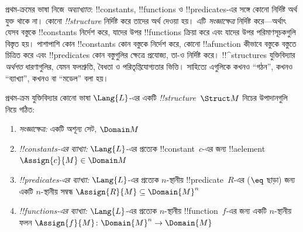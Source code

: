 \documentclass[../../../include/open-logic-section]{subfiles}
\begin{document}


\begin{explain}
প্রথম-ক্রমের ভাষা নিজে \emph{অব্যাখ্যাত}: !!{constant}s,
!!{function}s ও !!{predicate}s-এর সঙ্গে কোনো নির্দিষ্ট অর্থ যুক্ত থাকে
না। কোনো  \emph{!!{structure}} নির্দিষ্ট করে তাদের
অর্থ দেওয়া হয়। এটি \emph{সংজ্ঞাক্ষেত্র} নির্দিষ্ট করে—অর্থাৎ যেসব
বস্তুকে !!{constant}s নির্দেশ করে, যাদের উপর !!{function}s ক্রিয়া করে
এবং যাদের উপর পরিমাণসূচকগুলি বিস্তৃত হয়। পাশাপাশি কোন !!{constant}s
কোন বস্তুকে নির্দেশ করে, কোনো !!a{function} কীভাবে বস্তুকে বস্তুতে
চিত্রিত করে এবং !!{predicate}s কোন বস্তুগুলির ক্ষেত্রে প্রযোজ্য, তা-ও
নির্দিষ্ট করে। !!^{structure}s যুক্তিবিদ্যার \emph{অর্থগত} ধারণাগুলির,
যেমন ফলশ্রুতি, বৈধতা ও পরিতৃপ্তিযোগ্যতার ভিত্তি। সাহিত্যে এগুলিকে কখনও
“গঠন”, কখনও “ব্যাখ্যা”, কখনও বা “মডেল” বলা হয়।
\end{explain}

\begin{defn}[!!^{structure}s]
প্রথম-ক্রম যুক্তিবিদ্যার কোনো ভাষা $\Lang{L}$-এর একটি
 \emph{!!{structure}}~$\Struct M$ নিচের উপাদানগুলি
নিয়ে গঠিত:
\begin{enumerate}
\item \emph{সংজ্ঞাক্ষেত্র:} একটি অশূন্য সেট, $\Domain M$
\item \emph{!!{constant}s-এর ব্যাখ্যা:} $\Lang{L}$-এর প্রত্যেক
  !!{constant}~$c$-এর জন্য !!a{element} $\Assign{c}{M} \in \Domain M$
\item \emph{!!{predicate}s-এর ব্যাখ্যা:} $\Lang{L}$-এর প্রত্যেক
  $n$-স্থানীয় !!{predicate}~$R$-এর ($\eq$ ছাড়া) জন্য একটি
  $n$-স্থানীয় সম্বন্ধ $\Assign{R}{M} \subseteq \Domain{M}^n$
\item \emph{!!{function}s-এর ব্যাখ্যা:} $\Lang{L}$-এর প্রত্যেক
  $n$-স্থানীয় !!{function}~$f$-এর জন্য একটি $n$-স্থানীয় ফলন
  $\Assign{f}{M} \colon \Domain{M}^n \to \Domain{M}$
\end{enumerate}
\end{defn}
\end{document}
